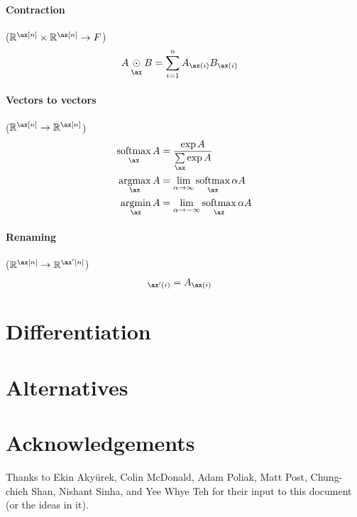 \documentclass{article}
\newcommand{\reals}{\mathbb{R}}
\begin{document}
\paragraph{Contraction} ($\reals^{\ax[n]} \times \reals^{\ax[n]} \rightarrow F$)
\begin{align*}
  A \ndot{\ax} B &= \sum_{i=1}^n A_{\ax(i)} B_{\ax(i)}
\end{align*}

\paragraph{Vectors to vectors} ($\reals^{\ax[n]} \rightarrow \reals^{\ax[n]}$)
\begin{align*}
  \nfun{\ax}{softmax} A &= \frac{\exp A}{\nsum{\ax} \exp A} \\
  \nfun{\ax}{argmax} A &= \lim_{\alpha \rightarrow \infty} \nfun{\ax}{softmax} \alpha A \\
  \nfun{\ax}{argmin} A &= \lim_{\alpha \rightarrow -\infty} \nfun{\ax}{softmax} \alpha A
\end{align*}

\paragraph{Renaming} ($\reals^{\ax[n]} \rightarrow \reals^{\ax'[n]}$)
\begin{align*}
  [A_{\ax\rightarrow\ax'}]_{\ax'(i)} &= A_{\ax(i)}
\end{align*}

\section{Differentiation}



\section{Alternatives}



\section*{Acknowledgements}

Thanks to Ekin Aky\"{u}rek, Colin McDonald, Adam Poliak, Matt Post, Chung-chieh Shan, Nishant Sinha, and Yee Whye Teh for their input to this document (or the ideas in it).

\iffalse %
\section*{References}
\fi



\end{document}
